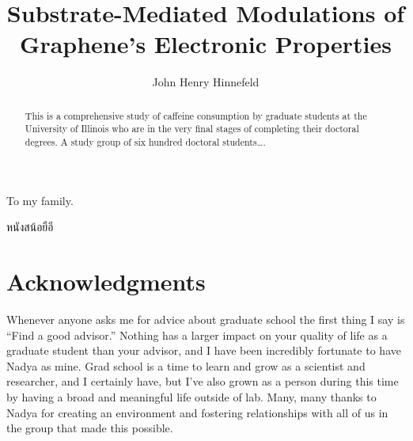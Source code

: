 \documentclass[edeposit,fullpage,draftthesis]{uiucthesis2009}
\begin{document}
\title{Substrate-Mediated Modulations of Graphene's Electronic Properties}
\author{John Henry Hinnefeld}
\phdthesis
{}
\maketitle

\frontmatter

\begin{abstract}
This is a comprehensive study of caffeine consumption by graduate
students at the University of Illinois who are in the very final
stages of completing their doctoral degrees. A study group of six
hundred doctoral students\ldots.
\end{abstract}

\begin{dedication}
To my family.

\foreignlanguage{thai}{\textthai{หนังสน้อยือี}}

\end{dedication}

\chapter*{Acknowledgments}

Whenever anyone asks me for advice about graduate school the first thing
I say is ``Find a good advisor.'' Nothing has a larger impact on your quality
of life as a graduate student than your advisor, and I have been incredibly fortunate
to have Nadya as mine. Grad school is a time to learn and 
grow as a scientist and researcher, and I certainly have, but I've also grown as a person
during this time by having a broad and meaningful life outside of lab.
Many, many thanks to Nadya for creating an environment and fostering relationships with all
of us in the group that made this possible.
\end{document}
